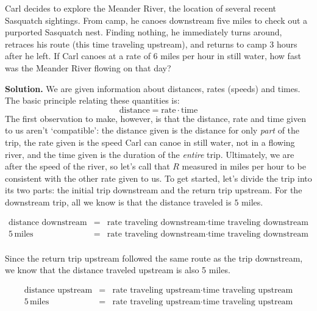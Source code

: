 \begin{ex}  \label{upstreamdownstreamex}  Carl decides to explore the Meander River, the location of several recent Sasquatch sightings.  From camp, he canoes downstream five miles to check out a purported Sasquatch nest.  Finding nothing, he immediately turns around, retraces his route (this time traveling upstream), and returns to camp 3 hours after he left.  If Carl canoes at a rate  of 6 miles per hour in still water, how fast was the Meander River flowing on that day?

\smallskip

{\bf Solution.}  We are given information about distances, rates (speeds) and times.  The basic principle relating these quantities is: \[ \text{distance} = \text{rate} \cdot \text{time}\]  The first observation to make, however, is that the distance, rate and time given to us aren't `compatible':  the distance given is the distance for only \textit{part} of the trip,  the rate given is the speed Carl can canoe in still water, not in a flowing river, and  the time given is the duration of the \textit{entire} trip.  Ultimately, we are after the speed of the river, so let's call that $R$ measured in miles per hour to be consistent with the other rate given to us.  To get started, let's divide the trip into its two parts:  the initial trip downstream and the return trip upstream.  For the downstream trip, all we know is that the distance traveled is $5$ miles.

\[ \begin{array}{rcl}

\text{distance downstream} & = & \text{rate traveling downstream} \cdot \text{time traveling downstream} \\

5 \, \text{miles} & = & \text{rate traveling downstream} \cdot \text{time traveling downstream} \\ \end{array} \]

Since the return trip upstream followed the same route as the trip downstream, we know that the distance traveled upstream is also 5 miles.

\[ \begin{array}{rcl}

\text{distance upstream} & = & \text{rate traveling upstream} \cdot \text{time traveling upstream} \\

5 \, \text{miles} & = & \text{rate traveling upstream} \cdot \text{time traveling upstream} \\ \end{array} \]


\end{ex}
